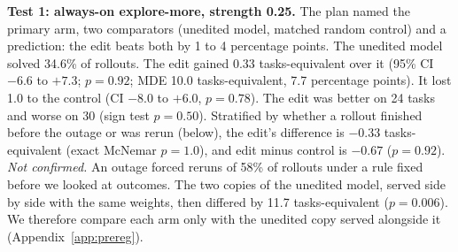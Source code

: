 \begin{table}[t]
\caption{Held-out tests: solved rollouts of 390 per arm (130 tasks $\times$ 3). Arms are compared only within a group. In Test 1 the arms ran in two groups of three, each with its own separately served copy of the unedited model (the same weights).}
\label{tab:heldout}
\centering
\small
{}
\end{table}

\textbf{Test 1: always-on explore-more, strength 0.25.} The plan named the primary arm, two comparators (unedited model, matched random control) and a prediction: the edit beats both by 1 to 4 percentage points. The unedited model solved 34.6\% of rollouts. The edit gained 0.33 tasks-equivalent over it (95\% CI $-6.6$ to $+7.3$; $p = 0.92$; MDE 10.0 tasks-equivalent, 7.7 percentage points). It lost 1.0 to the control (CI $-8.0$ to $+6.0$, $p = 0.78$). The edit was better on 24 tasks and worse on 30 (sign test $p = 0.50$). Stratified by whether a rollout finished before the outage or was rerun (below), the edit's difference is $-0.33$ tasks-equivalent (exact McNemar $p = 1.0$), and edit minus control is $-0.67$ ($p = 0.92$). \emph{Not confirmed.} An outage forced reruns of 58\% of rollouts under a rule fixed before we looked at outcomes. The two copies of the unedited model, served side by side with the same weights, then differed by 11.7 tasks-equivalent ($p = 0.006$). We therefore compare each arm only with the unedited copy served alongside it (Appendix~\ref{app:prereg}).

